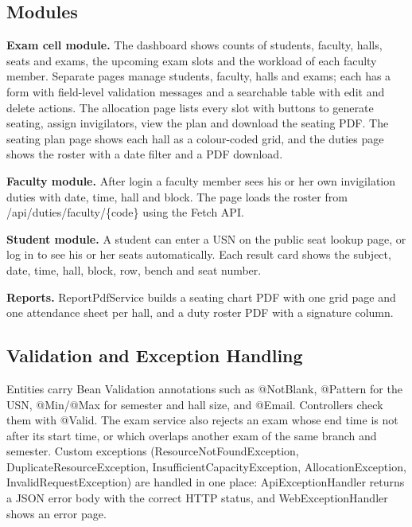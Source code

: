 \documentclass[12pt,letterpaper]{article}
\renewcommand{\texttt}[1]{#1}
\begin{document}
\subsection{Modules}
\textbf{Exam cell module.} The dashboard shows counts of students, faculty, halls, seats and exams, the upcoming exam slots and the workload of each faculty member. Separate pages manage students, faculty, halls and exams; each has a form with field-level validation messages and a searchable table with edit and delete actions. The allocation page lists every slot with buttons to generate seating, assign invigilators, view the plan and download the seating PDF. The seating plan page shows each hall as a colour-coded grid, and the duties page shows the roster with a date filter and a PDF download.

\textbf{Faculty module.} After login a faculty member sees his or her own invigilation duties with date, time, hall and block. The page loads the roster from \texttt{/api/duties/faculty/\{code\}} using the Fetch API.

\textbf{Student module.} A student can enter a USN on the public seat lookup page, or log in to see his or her seats automatically. Each result card shows the subject, date, time, hall, block, row, bench and seat number.

\textbf{Reports.} \texttt{ReportPdfService} builds a seating chart PDF with one grid page and one attendance sheet per hall, and a duty roster PDF with a signature column.

\subsection{Validation and Exception Handling}
Entities carry Bean Validation annotations such as \texttt{@NotBlank}, \texttt{@Pattern} for the USN, \texttt{@Min}/\texttt{@Max} for semester and hall size, and \texttt{@Email}. Controllers check them with \texttt{@Valid}. The exam service also rejects an exam whose end time is not after its start time, or which overlaps another exam of the same branch and semester. Custom exceptions (\texttt{ResourceNotFoundException}, \texttt{DuplicateResourceException}, \texttt{InsufficientCapacityException}, \texttt{AllocationException}, \texttt{InvalidRequestException}) are handled in one place: \texttt{ApiExceptionHandler} returns a JSON error body with the correct HTTP status, and \texttt{WebExceptionHandler} shows an error page.
\end{document}
